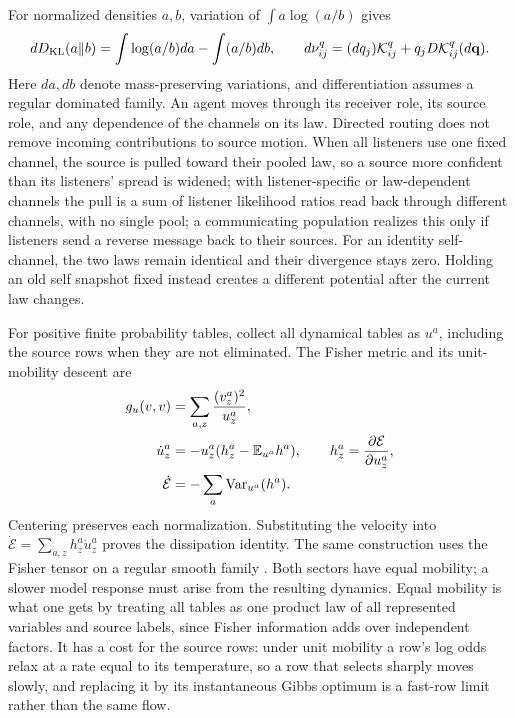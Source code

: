 For normalized densities $a,b$, variation of $\int a\log(a/b)$ gives
\begin{equation}
 dD_{\mathrm{KL}}(a\Vert b)=\int\log(a/b)da-\int(a/b)db,
 \qquad
 d\nu^q_{ij}=(dq_j)\mathcal K^q_{ij}
             +q_jD\mathcal K^q_{ij}(d\mathbf q).
 \label{eq:comp-all-role-variation}
\end{equation}
Here $da,db$ denote mass-preserving variations, and differentiation assumes a regular dominated family. An agent moves through its receiver role, its source role, and any dependence of the channels on its law. Directed routing does not remove incoming contributions to source motion. When all listeners use one fixed channel, the source is pulled toward their pooled law, so a source more confident than its listeners' spread is widened; with listener-specific or law-dependent channels the pull is a sum of listener likelihood ratios read back through different channels, with no single pool; a communicating population realizes this only if listeners send a reverse message back to their sources. For an identity self-channel, the two laws remain identical and their divergence stays zero. Holding an old self snapshot fixed instead creates a different potential after the current law changes.

For positive finite probability tables, collect all dynamical tables as $u^a$, including the source rows when they are not eliminated. The Fisher metric and its unit-mobility descent are
\begin{equation}
 \begin{aligned}
 g_u(v,v)&=\sum_{a,z}\frac{(v_z^a)^2}{u_z^a},\\
 \dot u_z^a&=-u_z^a(h_z^a-\mathbb E_{u^a}h^a),\qquad
 h_z^a=\frac{\partial\mathcal E}{\partial u_z^a},\\
 \dot{\mathcal E}&=-\sum_a\operatorname{Var}_{u^a}(h^a).
 \end{aligned}
 \label{eq:comp-fisher-descent}
\end{equation}
Centering preserves each normalization. Substituting the velocity into $\dot{\mathcal E}=\sum_{a,z}h_z^a\dot u_z^a$ proves the dissipation identity. The same construction uses the Fisher tensor on a regular smooth family \citep{Amari1998}. Both sectors have equal mobility; a slower model response must arise from the resulting dynamics. Equal mobility is what one gets by treating all tables as one product law of all represented variables and source labels, since Fisher information adds over independent factors. It has a cost for the source rows: under unit mobility a row's log odds relax at a rate equal to its temperature, so a row that selects sharply moves slowly, and replacing it by its instantaneous Gibbs optimum is a fast-row limit rather than the same flow.


